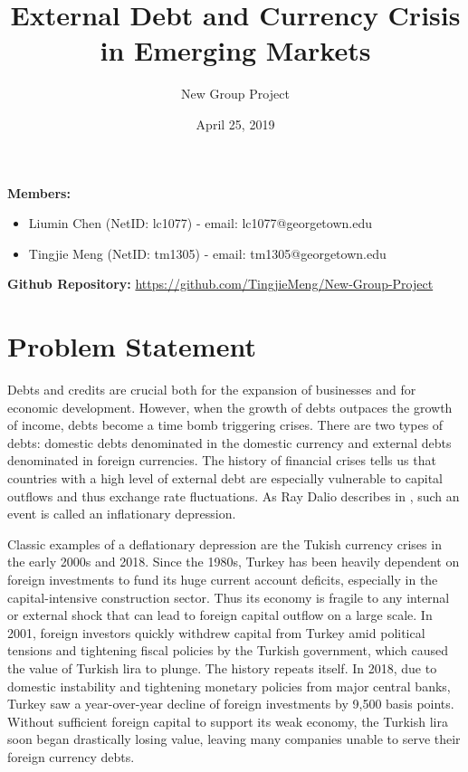 \documentclass[12pt,]{article}
\title{External Debt and Currency Crisis in Emerging Markets}
\author{New Group Project}
\date{April 25, 2019}
\begin{document}
\maketitle

\textbf{Members:}

\begin{itemize}
  \itemsep-.6em
  \item Liumin Chen (NetID: lc1077) - email: lc1077@georgetown.edu\
  \item Tingjie  Meng (NetID: tm1305) - email: tm1305@georgetown.edu\
\end{itemize}

\textbf{Github Repository:}
\url{https://github.com/TingjieMeng/New-Group-Project}

\section{Problem Statement}\label{problem-statement}

Debts and credits are crucial both for the expansion of businesses and
for economic development. However, when the growth of debts outpaces the
growth of income, debts become a time bomb triggering crises. There are
two types of debts: domestic debts denominated in the domestic currency
and external debts denominated in foreign currencies. The history of
financial crises tells us that countries with a high level of external
debt are especially vulnerable to capital outflows and thus exchange
rate fluctuations. As Ray Dalio describes in , such an event is called
an inflationary depression.

Classic examples of a deflationary depression are the Tukish currency
crises in the early 2000s and 2018. Since the 1980s, Turkey has been
heavily dependent on foreign investments to fund its huge current
account deficits, especially in the capital-intensive construction
sector. Thus its economy is fragile to any internal or external shock
that can lead to foreign capital outflow on a large scale. In 2001,
foreign investors quickly withdrew capital from Turkey amid political
tensions and tightening fiscal policies by the Turkish government, which
caused the value of Turkish lira to plunge. The history repeats itself.
In 2018, due to domestic instability and tightening monetary policies
from major central banks, Turkey saw a year-over-year decline of foreign
investments by 9,500 basis points. Without sufficient foreign capital to
support its weak economy, the Turkish lira soon began drastically losing
value, leaving many companies unable to serve their foreign currency
debts.
\end{document}
